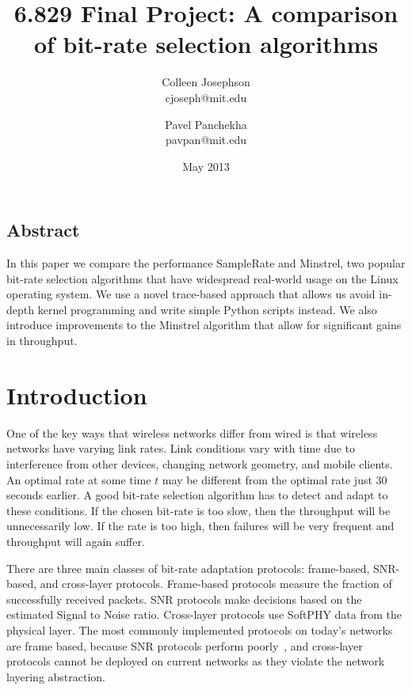\documentclass[letterpaper,twocolumn,10pt]{article}
\begin{document}

\title{\Large \bf 6.829 Final Project: A comparison of bit-rate selection algorithms}
\author{
{\rm Colleen Josephson}\\
cjoseph@mit.edu
\and
{\rm Pavel Panchekha}\\
pavpan@mit.edu
} %

\date{May 2013}

\maketitle


\subsection*{Abstract}
In this paper we compare the performance SampleRate and Minstrel, two popular bit-rate selection algorithms that have widespread real-world usage on the Linux operating system. We use a novel trace-based approach that allows us avoid in-depth kernel programming and write simple Python scripts instead. We also introduce improvements to the Minstrel algorithm that allow for significant gains in throughput. 
\section{Introduction}

One of the key ways that wireless networks differ from wired is that wireless networks have varying link rates. Link conditions vary with time due to interference from other devices, changing network geometry, and mobile clients. An optimal rate at some time $t$ may be different from the optimal rate just 30 seconds earlier. A good bit-rate selection algorithm has to detect and adapt to these conditions. If the chosen bit-rate is too slow, then the throughput will be unnecessarily low. If the rate is too high, then failures will be very frequent and throughput will again suffer. 

There are three main classes of bit-rate adaptation protocols: frame-based, SNR-based, and cross-layer protocols. Frame-based protocols measure the fraction of successfully received packets. SNR protocols make decisions based on the estimated Signal to Noise ratio. Cross-layer protocols use SoftPHY data from the physical layer. The most commonly implemented protocols on today's networks are frame based, because SNR protocols perform poorly~\cite{samplerate}, and cross-layer protocols cannot be deployed on current networks as they violate the network layering abstraction. 
\end{document}
